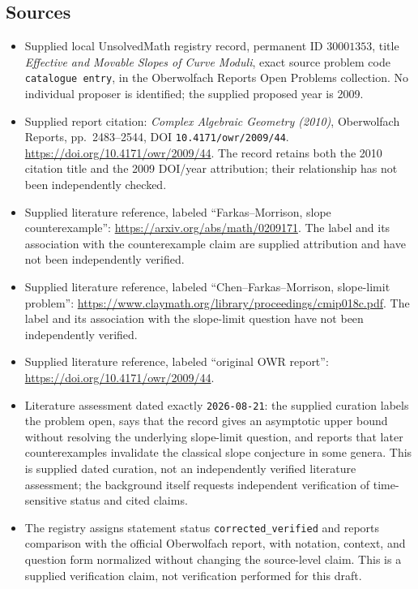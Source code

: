 \documentclass[11pt]{article}
\begin{document}
\subsection{Sources}
\begin{itemize}
\item Supplied local UnsolvedMath registry record, permanent ID \(30001353\), title \emph{Effective and Movable Slopes of Curve Moduli}, exact source problem code \texttt{catalogue entry}, in the Oberwolfach Reports Open Problems collection. No individual proposer is identified; the supplied proposed year is 2009.
\item Supplied report citation: \emph{Complex Algebraic Geometry (2010)}, Oberwolfach Reports, pp.\ 2483--2544, DOI \texttt{10.4171/owr/2009/44}. \url{https://doi.org/10.4171/owr/2009/44}. The record retains both the 2010 citation title and the 2009 DOI/year attribution; their relationship has not been independently checked.
\item Supplied literature reference, labeled ``Farkas--Morrison, slope counterexample'': \url{https://arxiv.org/abs/math/0209171}. The label and its association with the counterexample claim are supplied attribution and have not been independently verified.
\item Supplied literature reference, labeled ``Chen--Farkas--Morrison, slope-limit problem'': \url{https://www.claymath.org/library/proceedings/cmip018c.pdf}. The label and its association with the slope-limit question have not been independently verified.
\item Supplied literature reference, labeled ``original OWR report'': \url{https://doi.org/10.4171/owr/2009/44}.
\item Literature assessment dated exactly \texttt{2026-08-21}: the supplied curation labels the problem open, says that the record gives an asymptotic upper bound without resolving the underlying slope-limit question, and reports that later counterexamples invalidate the classical slope conjecture in some genera. This is supplied dated curation, not an independently verified literature assessment; the background itself requests independent verification of time-sensitive status and cited claims.
\item The registry assigns statement status \texttt{corrected\_verified} and reports comparison with the official Oberwolfach report, with notation, context, and question form normalized without changing the source-level claim. This is a supplied verification claim, not verification performed for this draft.
\end{itemize}
\end{document}
